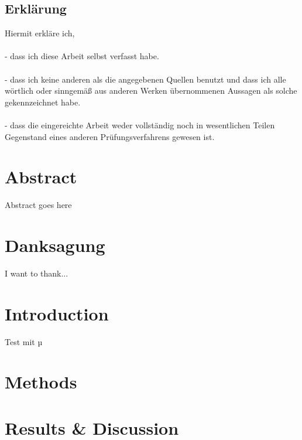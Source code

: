 





\section*{Erkl\"arung}

Hiermit erkl\"are ich,
\\
\\
- dass ich diese Arbeit selbst verfasst habe.
\\
\\
- dass ich keine anderen als die angegebenen Quellen benutzt und dass ich alle wörtlich oder sinngemäß aus anderen Werken \"ubernommenen Aussagen als solche gekennzeichnet habe.
\\
\\
- dass die eingereichte Arbeit weder vollst\"andig noch in wesentlichen Teilen Gegenstand eines anderen Pr\"ufungsverfahrens gewesen ist.

\newpage

\chapter*{Abstract}
Abstract goes here

\chapter*{Danksagung}
I want to thank...

\tableofcontents
\listoffigures
\listoftables

\chapter{Introduction}
% 

Test mit µ

\chapter{Methods}
% 

\chapter{Results \& Discussion}
% 

